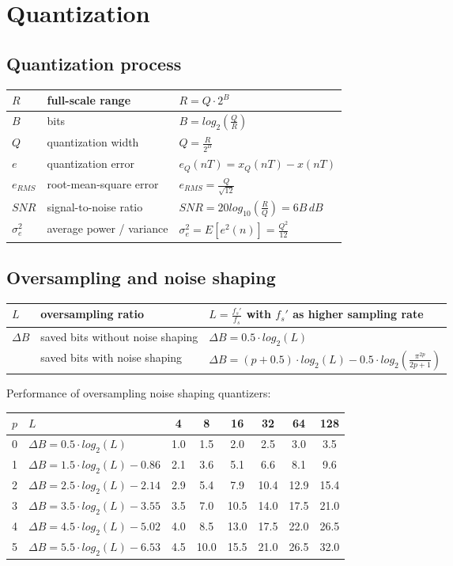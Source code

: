 \section{Quantization}

\subsection{Quantization process}
\begin{tabular}{|l|l|l|}
	\hline
	$R$			& full-scale range		& $R = Q \cdot 2^B$
	\\ \hline
	$B$			& bits					& $B = log_2(\frac{Q}{R})$
	\\ \hline
	$Q$			& quantization width	& $Q = \frac{R}{2^B}$
	\\ \hline
	$e$			& quantization error	& $e_Q(nT) = x_Q(nT) -x(nT)$
	\\ \hline
	$e_{RMS}$	& root-mean-square error & $e_{RMS} = \frac{Q}{\sqrt{12}}$
	\\ \hline
	$SNR$		& signal-to-noise ratio	& $SNR = 20 log_{10}(\frac{R}{Q}) = 6B\, dB$
	\\ \hline
	$\sigma_e^2$& average power / variance & $\sigma_e^2 = E[e^2(n)] = \frac{Q^2}{12}$
	\\ \hline
\end{tabular}


\subsection{Oversampling and noise shaping}
\begin{tabular}{|l|l|l|}
	\hline
	$L$	& oversampling ratio	& $L = \frac{f_s'}{f_s}$ with $f_s'$ as higher sampling rate
	\\ \hline
	$\Delta B$	& saved bits without noise shaping	& $\Delta B = 0.5 \cdot log_2(L)$ \\
				& saved bits with noise shaping		& $\Delta B = (p + 0.5) \cdot log_2(L) - 0.5 \cdot log_2(\frac{\pi^{2p}}{2p + 1})$
	\\ \hline
\end{tabular}

Performance of oversampling noise shaping quantizers:

\begin{tabular}{|c|l|c|c|c|c|c|c|}
	\hline
	$p$	& $L$							& 4		& 8		& 16	& 32	& 64	& 128
	\\ \hline
	0	& $\Delta B =0.5 \cdot log_2(L)$		& 1.0	& 1.5	& 2.0	& 2.5	& 3.0	& 3.5 \\
	1	& $\Delta B =1.5 \cdot log_2(L) - 0.86$ & 2.1	& 3.6	& 5.1	& 6.6	& 8.1	& 9.6 \\
	2	& $\Delta B =2.5 \cdot log_2(L) - 2.14$	& 2.9	& 5.4	& 7.9	& 10.4	& 12.9	& 15.4 \\
	3	& $\Delta B =3.5 \cdot log_2(L) - 3.55$	& 3.5	& 7.0	& 10.5	& 14.0	& 17.5	& 21.0 \\
	4	& $\Delta B =4.5 \cdot log_2(L) - 5.02$	& 4.0	& 8.5	& 13.0	& 17.5	& 22.0	& 26.5 \\
	5	& $\Delta B =5.5 \cdot log_2(L) - 6.53$	& 4.5	& 10.0	& 15.5	& 21.0	& 26.5	& 32.0 \\
	\hline
\end{tabular}
\resetArrayStretch


